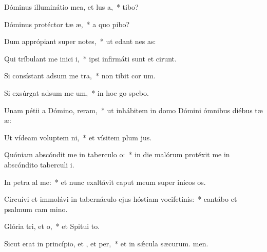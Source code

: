 \item Dóminus illuminátio mea, et lus a,~*  tibo?
\item Dóminus protéctor tæ æ,~* a quo pibo?
\item Dum apprópiant super  notes,~* ut edant nes as:
\item Qui tríbulant me inici i,~* ipsi infirmáti sunt et cirunt.
\item Si consístant adsum me tra,~* non tibit cor um.
\item Si exsúrgat adsum me um,~* in hoc go spebo.
\item Unam pétii a Dómino,  reram,~* ut inhábitem in domo Dómini ómnibus diébus tæ æ:
\item Ut vídeam voluptem ni,~* et vísitem plum jus.
\item Quóniam abscóndit me in taberculo o:~* in die malórum protéxit me in abscóndito taberculi i.
\item In petra al me:~* et nunc exaltávit caput meum super inicos os.
\item Circuívi et immolávi in tabernáculo ejus hóstiam vocifetinis:~* cantábo et psalmum cam mino.
\item Glória tri, et o,~* et Spitui to.
\item Sicut erat in princípio, et , et per,~* et in sǽcula sæcurum. men.

